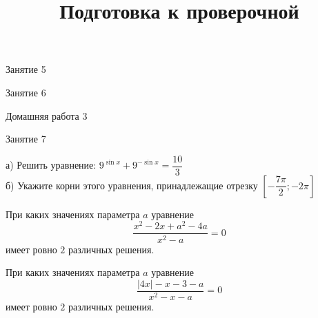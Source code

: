 \begin{class}[number=5]
	\begin{listofex}
		\item Занятие 5
	\end{listofex}
\end{class}

\begin{class}[number=6]
	\begin{listofex}
		\item Занятие 6
	\end{listofex}
\end{class}

\begin{homework}[number=3]
	\begin{listofex}
		\item Домашняя работа 3
	\end{listofex}
\end{homework}

\begin{class}[number=7]
	\title{Подготовка к проверочной}
	\begin{listofex}
		\item Занятие 7
	\end{listofex}
\end{class}

\begin{class}[number=8]
	\begin{listofex}
		\item а) Решить уравнение: \( 9^{\sin x}+9^{-\sin x}=\dfrac{10}{3} \)\\
		б) Укажите корни этого уравнения, принадлежащие отрезку \( \left[ -\dfrac{7\pi}{2};-2\pi \right] \)
		\item При каких значениях параметра \( a \) уравнение
		\[ \dfrac{x^2-2x+a^2-4a}{x^2-a}=0 \]
		имеет ровно \( 2 \) различных решения.
		\item При каких значениях параметра \( a \) уравнение
		\[ \dfrac{|4x|-x-3-a}{x^2-x-a}=0 \]
		имеет ровно \( 2 \) различных решения.
	\end{listofex}
\end{class}
